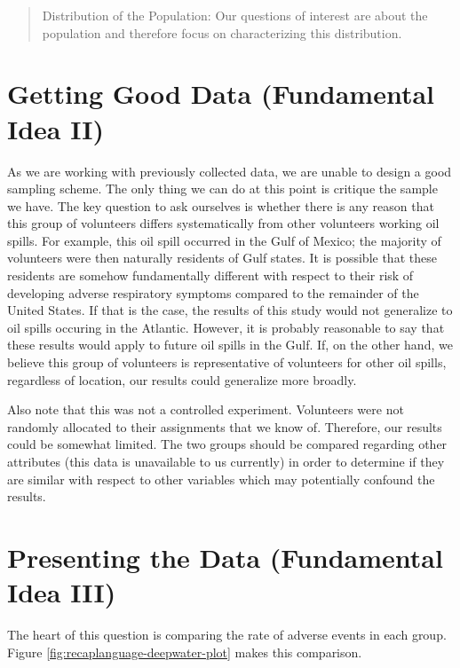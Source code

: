 \documentclass[]{book}
\theoremstyle{plain}
\theoremstyle{mydefn}
\theoremstyle{myexmpl}
\theoremstyle{remark}
\begin{document}
\begin{quote}
Distribution of the Population: Our questions of interest are about the
population and therefore focus on characterizing this distribution.
\end{quote}

\section{Getting Good Data (Fundamental Idea
II)}\label{getting-good-data-fundamental-idea-ii}

As we are working with previously collected data, we are unable to
design a good sampling scheme. The only thing we can do at this point is
critique the sample we have. The key question to ask ourselves is
whether there is any reason that this group of volunteers differs
systematically from other volunteers working oil spills. For example,
this oil spill occurred in the Gulf of Mexico; the majority of
volunteers were then naturally residents of Gulf states. It is possible
that these residents are somehow fundamentally different with respect to
their risk of developing adverse respiratory symptoms compared to the
remainder of the United States. If that is the case, the results of this
study would not generalize to oil spills occuring in the Atlantic.
However, it is probably reasonable to say that these results would apply
to future oil spills in the Gulf. If, on the other hand, we believe this
group of volunteers is representative of volunteers for other oil
spills, regardless of location, our results could generalize more
broadly.

Also note that this was not a controlled experiment. Volunteers were not
randomly allocated to their assignments that we know of. Therefore, our
results could be somewhat limited. The two groups should be compared
regarding other attributes (this data is unavailable to us currently) in
order to determine if they are similar with respect to other variables
which may potentially confound the results.

\section{Presenting the Data (Fundamental Idea
III)}\label{presenting-the-data-fundamental-idea-iii}

The heart of this question is comparing the rate of adverse events in
each group. Figure \ref{fig:recaplanguage-deepwater-plot} makes this
comparison.
\end{document}

